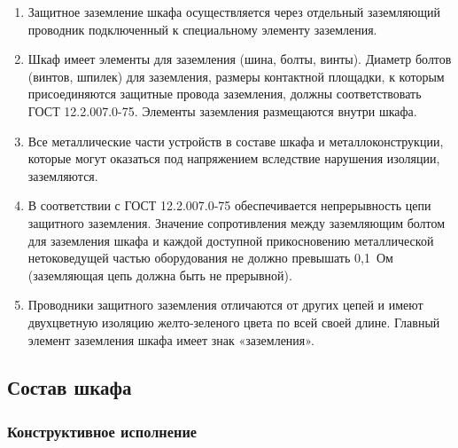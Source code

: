 \begin{enumerate}[label=\arabic{section}.\arabic{subsection}.\arabic{subsubsection}.\arabic*, align=left, labelsep=4pt, leftmargin=0pt, itemindent=2cm]

\item
Защитное заземление шкафа осуществляется через отдельный заземляющий проводник подключенный к специальному элементу заземления.

\item
Шкаф имеет элементы для заземления (шина, болты, винты).
Диаметр болтов (винтов, шпилек) для заземления, размеры контактной площадки, к которым присоединяются защитные провода заземления, должны соответствовать ГОСТ 12.2.007.0-75.
Элементы заземления размещаются внутри шкафа.

\item
Все металлические части устройств в составе шкафа и металлоконструкции, которые могут оказаться под напряжением вследствие нарушения изоляции, заземляются.

\item
В соответствии с ГОСТ 12.2.007.0-75 обеспечивается непрерывность цепи защитного заземления.
Значение сопротивления между заземляющим болтом для заземления шкафа и каждой доступной прикосновению металлической нетоковедущей частью оборудования не должно превышать 0,1~Ом (заземляющая цепь должна быть не прерывной).

\item
Проводники защитного заземления отличаются от других цепей и имеют двухцветную изоляцию желто-зеленого цвета по всей своей длине.
Главный элемент заземления шкафа имеет знак «заземления».

\end{enumerate}


\color{unidarkgreen}\subsection{Состав шкафа}\color{black}
\subsubsection{Конструктивное исполнение}


